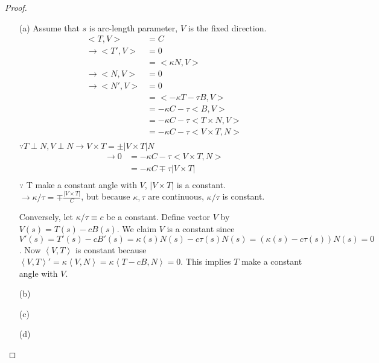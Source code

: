 \documentclass[10pt,a4paper]{article}
\begin{document}
\begin{proof}
\begin{enumerate}
\item[(a)]
Assume that $s$ is arc-length parameter, $V$ is the fixed direction.\\
\begin{align*}
<T,V>&=C\\
\rightarrow <T',V>&=0\\
&=<\kappa N,V>\\
\rightarrow <N,V>&=0\\
\rightarrow <N',V>&=0\\
&=<-\kappa T-\tau B,V>\\
&=-\kappa C-\tau <B,V>\\
&=-\kappa C-\tau <T\times N,V>\\
&=-\kappa C-\tau <V\times T,N>\\
\end{align*}
$\because T\perp N, V\perp N\rightarrow V\times T=\pm\left|V\times T\right|N$\\
\begin{align*}
\rightarrow 0&=-\kappa C-\tau <V\times T,N>\\
&=-\kappa C\mp\tau\left|V\times T\right|\\
\end{align*}
$\because$ T make a constant angle with $V$, $\left|V\times T\right|$ is a constant.\\
$\rightarrow \kappa/\tau=\mp\frac{\left|V\times T\right|}{C}$, but because $\kappa, \tau$ are continuous, $\kappa/\tau$ is constant.

Conversely, let $\kappa/\tau\equiv c$ be a constant. Define vector $V$ by $V(s) = T(s)-cB(s)$. We claim $V$ is a constant since $V'(s)=T'(s)-cB'(s)=\kappa(s) N(s) - c\tau(s) N(s) = (\kappa(s)-c\tau(s))N(s)=0$. Now $\left\langle V, T\right\rangle$ is constant because $\left\langle V, T\right\rangle'=\kappa\left\langle V,N\right\rangle = \kappa\left\langle T-cB, N\right\rangle = 0$. This implies $T$ make a constant angle with $V$.
\item[(b)]
\item[(c)]
\item[(d)]
\end{enumerate}
\end{proof}
\end{document}
